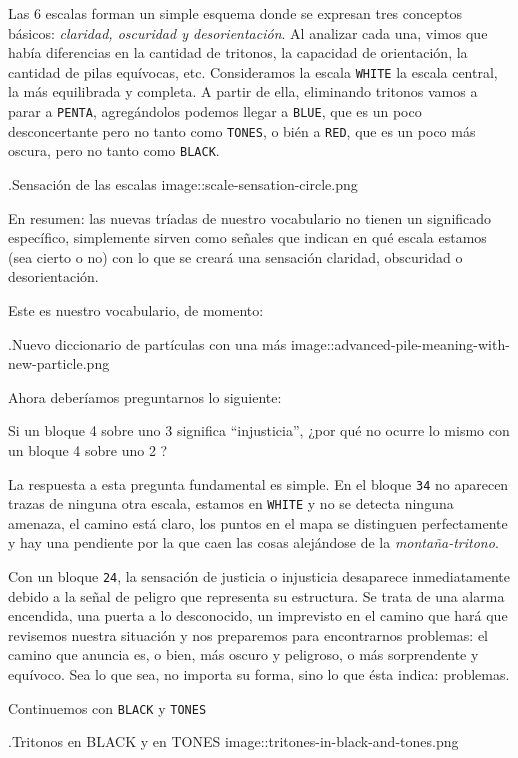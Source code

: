 \documentclass[]{article}
\begin{document}
Las 6 escalas forman un simple esquema donde se expresan tres conceptos básicos: \emph{claridad, oscuridad y   desorientación}. Al analizar cada una, vimos que había diferencias en la cantidad de tritonos, la capacidad de orientación, la cantidad de pilas equívocas, etc. Consideramos la escala \texttt{WHITE} la escala central, la más equilibrada y completa. A partir de ella, eliminando tritonos vamos a parar a \texttt{PENTA}, agregándolos podemos llegar a \texttt{BLUE}, que es un poco desconcertante pero no tanto como \texttt{TONES}, o bién a \texttt{RED}, que es un poco más oscura, pero no tanto como \texttt{BLACK}.

.Sensación de las escalas image::scale-sensation-circle.png

En resumen: las nuevas tríadas de nuestro vocabulario no tienen un significado específico, simplemente sirven como señales que indican en qué escala estamos (sea cierto o no) con lo que se creará una sensación claridad, obscuridad o desorientación.

Este es nuestro vocabulario, de momento:

.Nuevo diccionario de partículas con una más image::advanced-pile-meaning-with-new-particle.png

Ahora deberíamos preguntarnos lo siguiente:

Si un bloque 4 sobre uno 3 significa ``injusticia'', ¿por qué no ocurre lo mismo con un bloque 4 sobre uno 2 ?

La respuesta a esta pregunta fundamental es simple. En el bloque \texttt{34} no aparecen trazas de ninguna otra escala, estamos en \texttt{WHITE} y no se detecta ninguna amenaza, el camino está claro, los puntos en el mapa se distinguen perfectamente y hay una pendiente por la que caen las cosas alejándose de la \emph{montaña-tritono}.

Con un bloque \texttt{24}, la sensación de justicia o injusticia desaparece inmediatamente debido a la señal de peligro que representa su estructura. Se trata de una alarma encendida, una puerta a lo desconocido, un imprevisto en el camino que hará que revisemos nuestra situación y nos preparemos para encontrarnos problemas: el camino que anuncia es, o bien, más oscuro y peligroso, o más sorprendente y equívoco. Sea lo que sea, no importa su forma, sino lo que ésta indica: problemas.

Continuemos con \texttt{BLACK} y \texttt{TONES}

.Tritonos en BLACK y en TONES image::tritones-in-black-and-tones.png
\end{document}
